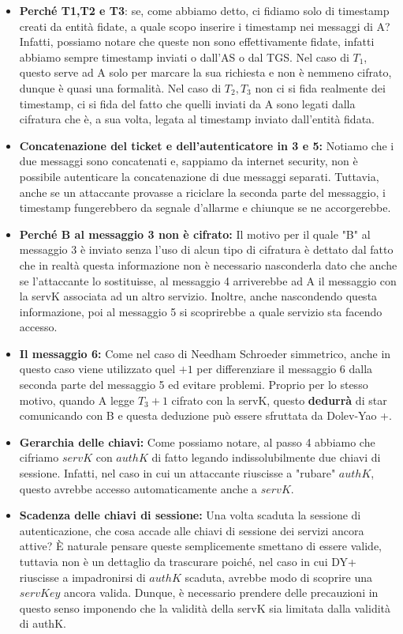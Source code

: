 \begin{itemize}
    \item \textbf{Perché T1,T2 e T3}: se, come abbiamo detto, ci fidiamo solo di timestamp creati da entità fidate, a quale scopo inserire i timestamp nei messaggi di A? Infatti, possiamo notare che queste non sono effettivamente fidate, infatti abbiamo sempre timestamp inviati o dall'AS o dal TGS. Nel caso di $T_1$, questo serve ad A solo per marcare la sua richiesta e non è nemmeno cifrato, dunque è quasi una formalità. Nel caso di $T_2,T_3$ non ci si fida realmente dei timestamp, ci si fida del fatto che quelli inviati da A sono legati dalla cifratura che è, a sua volta, legata al timestamp inviato dall'entità fidata.   
    \item \textbf{Concatenazione del ticket e dell'autenticatore in 3 e 5:} Notiamo che i due messaggi sono concatenati e, sappiamo da internet security, non è possibile autenticare la concatenazione di due messaggi separati. Tuttavia, anche se un attaccante provasse a riciclare la seconda parte del messaggio, i timestamp fungerebbero da segnale d'allarme e chiunque se ne accorgerebbe. 
    \item \textbf{Perché B al messaggio 3 non è cifrato:} Il motivo per il quale "B" al messaggio 3 è inviato senza l'uso di alcun tipo di cifratura è dettato dal fatto che in realtà questa informazione non è necessario nasconderla dato che anche se l'attaccante lo sostituisse, al messaggio 4 arriverebbe ad A il messaggio con la servK associata ad un altro servizio. Inoltre, anche nascondendo questa informazione, poi al messaggio 5 si scoprirebbe a quale servizio sta facendo accesso. 
    \item \textbf{Il messaggio 6: } Come nel caso di Needham Schroeder simmetrico, anche in questo caso viene utilizzato quel $+1$ per differenziare il messaggio 6 dalla seconda parte del messaggio 5 ed evitare problemi. Proprio per lo stesso motivo, quando A legge $T_3 + 1$ cifrato con la servK, questo \textbf{dedurrà} di star comunicando con B e questa deduzione può essere sfruttata da Dolev-Yao +. 
    \item \textbf{Gerarchia delle chiavi: }Come possiamo notare, al passo 4 abbiamo che cifriamo $servK$ con $authK$ di fatto legando indissolubilmente due chiavi di sessione. Infatti, nel caso in cui un attaccante riuscisse a "rubare" $authK$, questo avrebbe accesso automaticamente anche a $servK$.
    \item \textbf{Scadenza delle chiavi di sessione: }Una volta scaduta la sessione di autenticazione, che cosa accade alle chiavi di sessione dei servizi ancora attive? È naturale pensare queste semplicemente smettano di essere valide, tuttavia non è un dettaglio da trascurare poiché, nel caso in cui DY+ riuscisse a impadronirsi di $authK$ scaduta, avrebbe modo di scoprire una $servKey$ ancora valida. Dunque, è necessario prendere delle precauzioni in questo senso imponendo che la validità della servK sia limitata dalla validità di authK. \\

\end{itemize}
